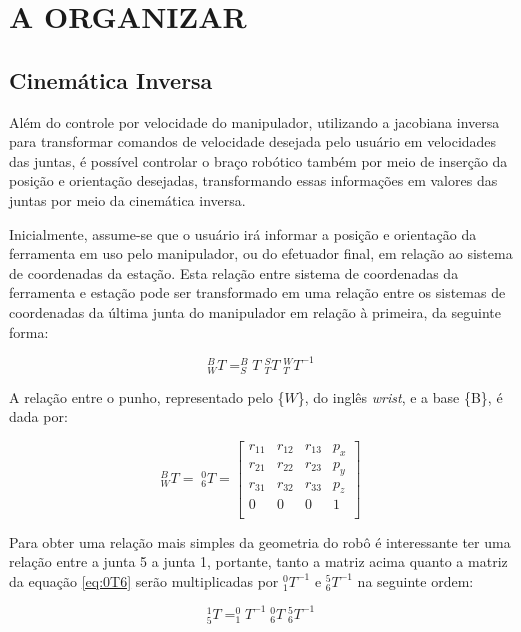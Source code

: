 \chapter{A ORGANIZAR}

\section{Cinemática Inversa}
Além do controle por velocidade do manipulador, utilizando a jacobiana inversa
para transformar comandos de velocidade desejada pelo usuário em velocidades das juntas, é possível controlar 
o braço robótico também por meio de inserção da posição e orientação desejadas, transformando
essas informações em valores das juntas por meio da cinemática inversa.

Inicialmente, assume-se que o usuário irá informar a posição e orientação da ferramenta em uso pelo
manipulador, ou do efetuador final, em relação ao sistema de coordenadas da estação. Esta relação entre 
sistema de coordenadas da ferramenta e estação pode ser transformado em uma relação 
entre os sistemas de coordenadas da última junta do manipulador em relação à primeira, da seguinte forma:

\begin{equation*}
    ^B_WT = ^B_S\!T\;^S_TT\;^W_TT^{-1}
\end{equation*}

A relação entre o punho, representado pelo \{$W$\}, do inglês \textit{wrist}, e a base \{B\},
é dada por:

\begin{equation*}
    ^B_WT = \; ^0_6T = 
    \begin{bmatrix}
        r_{11} & r_{12} & r_{13} & p_x \\
        r_{21} & r_{22} & r_{23} & p_y \\
        r_{31} & r_{32} & r_{33} & p_z \\
           0   &    0   &    0   &  1  \\    
    \end{bmatrix}
\end{equation*}

Para obter uma relação mais simples da geometria do robô é interessante ter uma relação 
entre a junta 5 a junta 1, portante, tanto a matriz acima quanto a matriz da equação \ref{eq:0T6}
serão multiplicadas por $^0_1T^{-1}$ e $^5_6T^{-1}$ na seguinte ordem:

\begin{equation*}
    ^1_5T = ^0_1\!T^{-1}\;^0_6T\;^5_6T^{-1}
\end{equation*}


